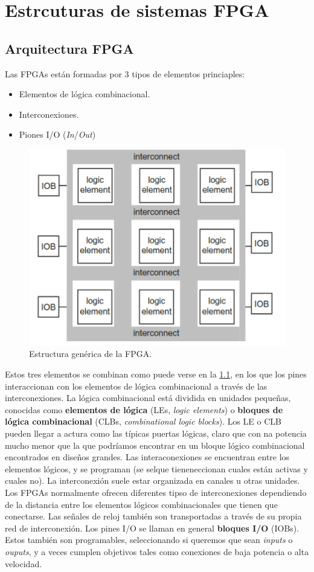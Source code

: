 \chapter{Estrcuturas de sistemas FPGA}

\section{Arquitectura FPGA}

Las FPGAs están formadas por 3 tipos de elementos princiaples: 

\begin{itemize}
    \item Elementos de lógica combinacional.
    \item Interconexiones.
    \item Piones I/O (\textit{In}/\textit{Out})
\end{itemize}
\begin{figure}[H] \centering
    \includegraphics[width=0.6\linewidth]{Imagenes/03/03-FPGA_Fabrics.png} 
    \caption{Estructura genérica de la FPGA.}   
    \label{Fig:03-FPGA_Fabric}
\end{figure}
Estos tres elementos se combinan como puede verse en la \cref{Fig:03-FPGA_Fabric}, en los que los pines interaccionan con los elementos de lógica combinacional a través de las interconexiones. La lógica combinacional está dividida en unidades pequeñas, conocidas como \textbf{elementos de lógica} (LEs, \textit{logic elements}) o \textbf{bloques de lógica combinacional} (CLBs, \textit{combinational logic blocks}). Los LE o CLB pueden llegar a actura como las típicas puertas lógicas, claro que con na potencia mucho menor que la que podríamos encontrar en un bloque lógico combinacional encontrados en diseños grandes. Las interaconexiones se encuentran entre los elementos lógicos, y se programan (se selque tieneneccionan cuales están activas y cuales no). La interconexión suele estar organizada en canales u otras unidades. Los FPGAs normalmente ofrecen diferentes tipso de interconexiones dependiendo de la distancia entre los elementos lógicos combinacionales que tienen que conectarse. Las señales de reloj también son transportadas a través de su propia red de interconexión. Los pines I/O se llaman en general \textbf{bloques I/O} (IOBs). Estos también son programables, seleccionando si queremos que sean \textit{inputs} o \textit{ouputs}, y a veces cumplen objetivos tales como conexiones de baja potencia o alta velocidad. 

